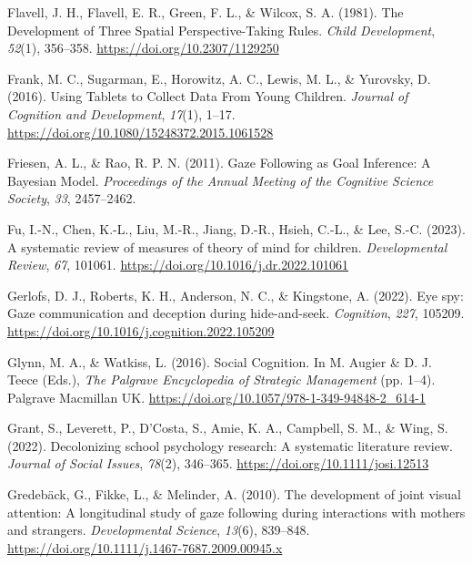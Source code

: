 \documentclass[
]{scrbook}
\newlength{\cslhangindent}
\newenvironment{CSLReferences}[2] %
 {\begin{list}{}{%
  \setlength{\itemindent}{0pt}
  \setlength{\leftmargin}{0pt}
  \setlength{\parsep}{0pt}
  \ifodd #1
   \setlength{\leftmargin}{\cslhangindent}
   \setlength{\itemindent}{-1\cslhangindent}
  \fi
  \setlength{\itemsep}{#2\baselineskip}}}
 {\end{list}}
\begin{document}
\begin{CSLReferences}{1}{0}
Flavell, J. H., Flavell, E. R., Green, F. L., \& Wilcox, S. A. (1981). The {Development} of {Three Spatial Perspective-Taking Rules}. \emph{Child Development}, \emph{52}(1), 356--358. \url{https://doi.org/10.2307/1129250}

Frank, M. C., Sugarman, E., Horowitz, A. C., Lewis, M. L., \& Yurovsky, D. (2016). Using {Tablets} to {Collect Data From Young Children}. \emph{Journal of Cognition and Development}, \emph{17}(1), 1--17. \url{https://doi.org/10.1080/15248372.2015.1061528}

Friesen, A. L., \& Rao, R. P. N. (2011). Gaze {Following} as {Goal Inference}: {A Bayesian Model}. \emph{Proceedings of the Annual Meeting of the Cognitive Science Society}, \emph{33}, 2457--2462.

Fu, I.-N., Chen, K.-L., Liu, M.-R., Jiang, D.-R., Hsieh, C.-L., \& Lee, S.-C. (2023). A systematic review of measures of theory of mind for children. \emph{Developmental Review}, \emph{67}, 101061. \url{https://doi.org/10.1016/j.dr.2022.101061}

Gerlofs, D. J., Roberts, K. H., Anderson, N. C., \& Kingstone, A. (2022). Eye spy: {Gaze} communication and deception during hide-and-seek. \emph{Cognition}, \emph{227}, 105209. \url{https://doi.org/10.1016/j.cognition.2022.105209}

Glynn, M. A., \& Watkiss, L. (2016). Social {Cognition}. In M. Augier \& D. J. Teece (Eds.), \emph{The {Palgrave Encyclopedia} of {Strategic Management}} (pp. 1--4). Palgrave Macmillan UK. \url{https://doi.org/10.1057/978-1-349-94848-2_614-1}

Grant, S., Leverett, P., D'Costa, S., Amie, K. A., Campbell, S. M., \& Wing, S. (2022). Decolonizing school psychology research: {A} systematic literature review. \emph{Journal of Social Issues}, \emph{78}(2), 346--365. \url{https://doi.org/10.1111/josi.12513}

Gredebäck, G., Fikke, L., \& Melinder, A. (2010). The development of joint visual attention: A longitudinal study of gaze following during interactions with mothers and strangers. \emph{Developmental Science}, \emph{13}(6), 839--848. \url{https://doi.org/10.1111/j.1467-7687.2009.00945.x}


\end{CSLReferences}
\end{document}
